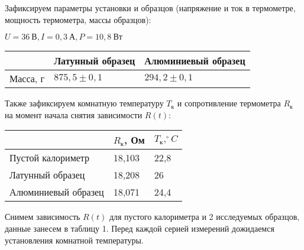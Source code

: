 \documentclass[12pt,a4paper]{article}
\begin{document}
Зафиксируем параметры установки и образцов (напряжение и ток в термометре, мощность термометра, массы образцов):

$U = 36~\text{В}, I = 0,3~\text{А}, P = 10,8~\text{Вт}$
\begin{table}[!h]
	\centering
	\begin{tabular}{|l|l|l|}
		\hline
		& Латунный образец & Алюминиевый образец \\ \hline
		Масса, г & $875,5\pm0,1$        & $294,2\pm0,1$           \\ \hline
	\end{tabular}
\end{table}

Также зафиксируем комнатную температуру $T_{\text{к}}$ и сопротивление термометра $R_{\text{к}}$ на момент начала снятия зависимости $R(t)$:

\begin{table}[!h]
	\centering
	\begin{tabular}{|l|l|l|}
		\hline
		& $R_{\text{к}}$, Ом     & $T_{\text{к}}, ^\circ C$    \\ \hline
		Пустой калориметр   & 18,103 & 22,8 \\ \hline
		Латунный образец    & 18,208 & 26   \\ \hline
		Алюминиевый образец & 18,071 & 24,4 \\ \hline
	\end{tabular}
\end{table}

Снимем зависимость $R(t)$ для пустого калориметра и 2 исследуемых образцов, данные занесем в таблицу 1. Перед каждой серией измерений дожидаемся установления комнатной температуры.
\end{document}
